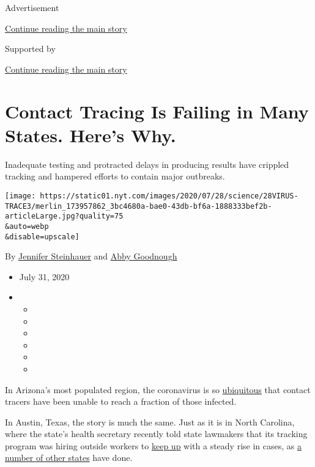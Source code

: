 Advertisement

\protect\hyperlink{after-top}{Continue reading the main story}

Supported by

\protect\hyperlink{after-sponsor}{Continue reading the main story}

\hypertarget{contact-tracing-is-failing-in-many-states-heres-why}{%
\section{Contact Tracing Is Failing in Many States. Here's
Why.}\label{contact-tracing-is-failing-in-many-states-heres-why}}

Inadequate testing and protracted delays in producing results have
crippled tracking and hampered efforts to contain major outbreaks.

\texttt{[image: https://static01.nyt.com/images/2020/07/28/science/28VIRUS-TRACE3/merlin\_173957862\_3bc4680a-bae0-43db-bf6a-1888333bef2b-articleLarge.jpg?quality=75\\\&auto=webp\\\&disable=upscale]}

By \href{https://www.nytimes.com/by/jennifer-steinhauer}{Jennifer
Steinhauer} and \href{https://www.nytimes.com/by/abby-goodnough}{Abby
Goodnough}

\begin{itemize}
\item
  July 31, 2020
\item
  \begin{itemize}
  \item
  \item
  \item
  \item
  \item
  \item
  \end{itemize}
\end{itemize}

In Arizona's most populated region, the coronavirus is so
\href{https://www.azfamily.com/news/continuing_coverage/coronavirus_coverage/contact-tracing-important-but-less-useful-with-spiking-cases-maricopa-county-says/article_57d55328-bb4b-11ea-8718-8b1cf4ab4137.html}{ubiquitous}
that contact tracers have been unable to reach a fraction of those
infected.

In Austin, Texas, the story is much the same. Just as it is in North
Carolina, where the state's health secretary recently told state
lawmakers that its tracking program was hiring outside workers to
\href{https://www.ncdhhs.gov/news/press-releases/ncdhhs-selects-first-vendors-expand-testing-and-contact-tracing-covid-19}{keep
up} with a steady rise in cases, as
\href{https://www.nashp.org/state-approaches-to-contact-tracing-covid-19/}{a
number of other states} have done.

